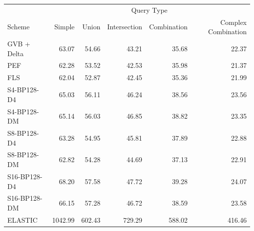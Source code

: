 \begin{tabular}{lrrrrr}
\toprule
 & \multicolumn{5}{c}{Query Type} \\
Scheme & Simple & Union & Intersection & Combination & Complex Combination \\
\midrule
GVB + Delta & 63.07 & 54.66 & 43.21 & 35.68 & 22.37 \\
PEF & 62.28 & 53.52 & 42.53 & 35.98 & 21.37 \\
FLS & 62.04 & 52.87 & 42.45 & 35.36 & 21.99 \\
S4-BP128-D4 & 65.03 & 56.11 & 46.24 & 38.56 & 23.56 \\
S4-BP128-DM & 65.14 & 56.03 & 46.85 & 38.82 & 23.35 \\
S8-BP128-D4 & 63.28 & 54.95 & 45.81 & 37.89 & 22.88 \\
S8-BP128-DM & 62.82 & 54.28 & 44.69 & 37.13 & 22.91 \\
S16-BP128-D4 & 68.20 & 57.58 & 47.72 & 39.28 & 24.07 \\
S16-BP128-DM & 66.15 & 57.28 & 46.72 & 38.59 & 23.58 \\
ELASTIC & 1042.99 & 602.43 & 729.29 & 588.02 & 416.46 \\
\bottomrule
\end{tabular}
